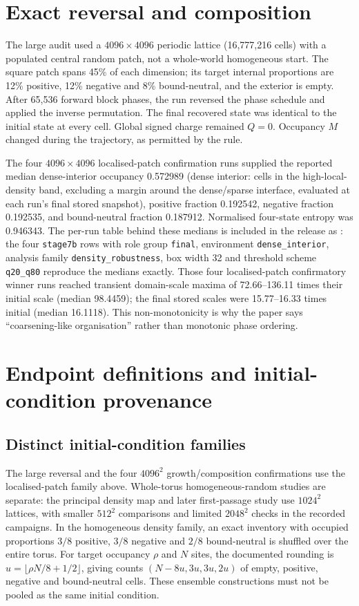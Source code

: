 \documentclass[11pt,a4paper]{article}
\newcommand{\code}[1]{\texttt{#1}}
\begin{document}
\section{Exact reversal and composition}
The large audit used a $4096\times4096$ periodic lattice (16,777,216 cells) with a populated central random patch, not a whole-world homogeneous start. The square patch spans 45\% of each dimension; its target internal proportions are 12\% positive, 12\% negative and 8\% bound-neutral, and the exterior is empty. After 65,536 forward block phases, the run reversed the phase schedule and applied the inverse permutation. The final recovered state was identical to the initial state at every cell. Global signed charge remained $Q=0$. Occupancy $M$ changed during the trajectory, as permitted by the rule.

The four $4096\times4096$ localised-patch confirmation runs supplied the reported median dense-interior occupancy 0.572989 (dense interior: cells in the high-local-density band, excluding a margin around the dense/sparse interface, evaluated at each run's final stored snapshot), positive fraction 0.192542, negative fraction 0.192535, and bound-neutral fraction 0.187912. Normalised four-state entropy was 0.946343. The per-run table behind these medians is included in the release as : the four \code{stage7b} rows with role group \code{final}, environment \code{dense\_interior}, analysis family \code{density\_robustness}, box width 32 and threshold scheme \code{q20\_q80} reproduce the medians exactly. Those four localised-patch confirmatory winner runs reached transient domain-scale maxima of 72.66--136.11 times their initial scale (median 98.4459); the final stored scales were 15.77--16.33 times initial (median 16.1118). This non-monotonicity is why the paper says ``coarsening-like organisation'' rather than monotonic phase ordering.

\section{Endpoint definitions and initial-condition provenance}
\subsection{Distinct initial-condition families}
The large reversal and the four $4096^2$ growth/composition confirmations use the localised-patch family above. Whole-torus homogeneous-random studies are separate: the principal density map and later first-passage study use $1024^2$ lattices, with smaller $512^2$ comparisons and limited $2048^2$ checks in the recorded campaigns. In the homogeneous density family, an exact inventory with occupied proportions $3/8$ positive, $3/8$ negative and $2/8$ bound-neutral is shuffled over the entire torus. For target occupancy $\rho$ and $N$ sites, the documented rounding is $u=\lfloor\rho N/8+1/2\rfloor$, giving counts $(N-8u,3u,3u,2u)$ of empty, positive, negative and bound-neutral cells. These ensemble constructions must not be pooled as the same initial condition.
\end{document}
